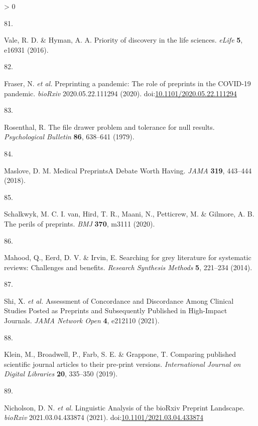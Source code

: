 \documentclass[a4paper, twoside]{templates/ociamthesis}
\newlength{\cslhangindent}
\newlength{\csllabelwidth}
\newenvironment{CSLReferences}[3] %
 {%
  \setlength{\parindent}{0pt}
  \ifodd #1 \everypar{\setlength{\hangindent}{\cslhangindent}}\ignorespaces\fi
  \ifnum #2 > 0
  \setlength{\parskip}{#2\baselineskip}
  \fi
 }%
 {}
\newcommand{\CSLLeftMargin}[1]{\parbox[t]{\maxof{\widthof{#1}}{\csllabelwidth}}{#1}}
\newcommand{\CSLRightInline}[1]{\parbox[t]{\linewidth - \csllabelwidth}{#1}}
\begin{document}
\begin{CSLReferences}{0}{0}
\leavevmode\hypertarget{ref-vale2016}{}%
\CSLLeftMargin{81. }
\CSLRightInline{Vale, R. D. \& Hyman, A. A. Priority of discovery in the life sciences. \emph{eLife} \textbf{5}, e16931 (2016).}

\leavevmode\hypertarget{ref-fraser2020preprinting}{}%
\CSLLeftMargin{82. }
\CSLRightInline{Fraser, N. \emph{et al.} Preprinting a pandemic: The role of preprints in the {COVID}-19 pandemic. \emph{bioRxiv} 2020.05.22.111294 (2020). doi:\href{https://doi.org/10.1101/2020.05.22.111294}{10.1101/2020.05.22.111294}}

\leavevmode\hypertarget{ref-rosenthal1979}{}%
\CSLLeftMargin{83. }
\CSLRightInline{Rosenthal, R. The file drawer problem and tolerance for null results. \emph{Psychological Bulletin} \textbf{86}, 638--641 (1979).}

\leavevmode\hypertarget{ref-maslove2018}{}%
\CSLLeftMargin{84. }
\CSLRightInline{Maslove, D. M. Medical {Preprints}{{A Debate Worth Having}}. \emph{JAMA} \textbf{319}, 443--444 (2018).}

\leavevmode\hypertarget{ref-schalkwyk2020}{}%
\CSLLeftMargin{85. }
\CSLRightInline{Schalkwyk, M. C. I. van, Hird, T. R., Maani, N., Petticrew, M. \& Gilmore, A. B. The perils of preprints. \emph{BMJ} \textbf{370}, m3111 (2020).}

\leavevmode\hypertarget{ref-mahood2014}{}%
\CSLLeftMargin{86. }
\CSLRightInline{Mahood, Q., Eerd, D. V. \& Irvin, E. Searching for grey literature for systematic reviews: Challenges and benefits. \emph{Research Synthesis Methods} \textbf{5}, 221--234 (2014).}

\leavevmode\hypertarget{ref-shi2021}{}%
\CSLLeftMargin{87. }
\CSLRightInline{Shi, X. \emph{et al.} Assessment of {Concordance} and {Discordance Among Clinical Studies Posted} as {Preprints} and {Subsequently Published} in {High}-{Impact Journals}. \emph{JAMA Network Open} \textbf{4}, e212110 (2021).}

\leavevmode\hypertarget{ref-klein2019}{}%
\CSLLeftMargin{88. }
\CSLRightInline{Klein, M., Broadwell, P., Farb, S. E. \& Grappone, T. Comparing published scientific journal articles to their pre-print versions. \emph{International Journal on Digital Libraries} \textbf{20}, 335--350 (2019).}

\leavevmode\hypertarget{ref-nicholson2021}{}%
\CSLLeftMargin{89. }
\CSLRightInline{Nicholson, D. N. \emph{et al.} Linguistic {Analysis} of the {bioRxiv Preprint Landscape}. \emph{bioRxiv} 2021.03.04.433874 (2021). doi:\href{https://doi.org/10.1101/2021.03.04.433874}{10.1101/2021.03.04.433874}}


\end{CSLReferences}
\end{document}
